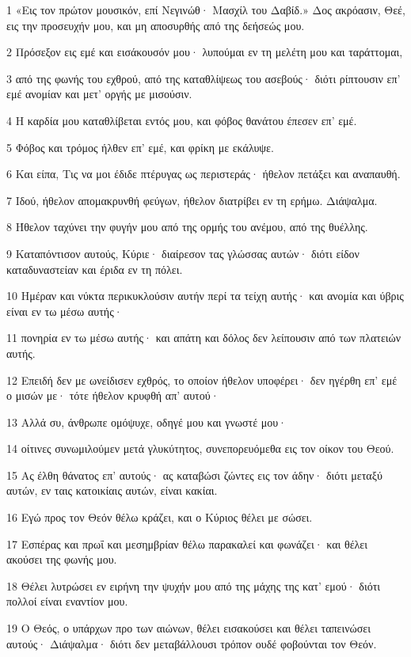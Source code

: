 \par 1 «Εις τον πρώτον μουσικόν, επί Νεγινώθ· Μασχίλ του Δαβίδ.» Δος ακρόασιν, Θεέ, εις την προσευχήν μου, και μη αποσυρθής από της δεήσεώς μου.
\par 2 Πρόσεξον εις εμέ και εισάκουσόν μου· λυπούμαι εν τη μελέτη μου και ταράττομαι,
\par 3 από της φωνής του εχθρού, από της καταθλίψεως του ασεβούς· διότι ρίπτουσιν επ' εμέ ανομίαν και μετ' οργής με μισούσιν.
\par 4 Η καρδία μου καταθλίβεται εντός μου, και φόβος θανάτου έπεσεν επ' εμέ.
\par 5 Φόβος και τρόμος ήλθεν επ' εμέ, και φρίκη με εκάλυψε.
\par 6 Και είπα, Τις να μοι έδιδε πτέρυγας ως περιστεράς· ήθελον πετάξει και αναπαυθή.
\par 7 Ιδού, ήθελον απομακρυνθή φεύγων, ήθελον διατρίβει εν τη ερήμω. Διάψαλμα.
\par 8 Ήθελον ταχύνει την φυγήν μου από της ορμής του ανέμου, από της θυέλλης.
\par 9 Καταπόντισον αυτούς, Κύριε· διαίρεσον τας γλώσσας αυτών· διότι είδον καταδυναστείαν και έριδα εν τη πόλει.
\par 10 Ημέραν και νύκτα περικυκλούσιν αυτήν περί τα τείχη αυτής· και ανομία και ύβρις είναι εν τω μέσω αυτής·
\par 11 πονηρία εν τω μέσω αυτής· και απάτη και δόλος δεν λείπουσιν από των πλατειών αυτής.
\par 12 Επειδή δεν με ωνείδισεν εχθρός, το οποίον ήθελον υποφέρει· δεν ηγέρθη επ' εμέ ο μισών με· τότε ήθελον κρυφθή απ' αυτού·
\par 13 Αλλά συ, άνθρωπε ομόψυχε, οδηγέ μου και γνωστέ μου·
\par 14 οίτινες συνωμιλούμεν μετά γλυκύτητος, συνεπορευόμεθα εις τον οίκον του Θεού.
\par 15 Ας έλθη θάνατος επ' αυτούς· ας καταβώσι ζώντες εις τον άδην· διότι μεταξύ αυτών, εν ταις κατοικίαις αυτών, είναι κακίαι.
\par 16 Εγώ προς τον Θεόν θέλω κράζει, και ο Κύριος θέλει με σώσει.
\par 17 Εσπέρας και πρωΐ και μεσημβρίαν θέλω παρακαλεί και φωνάζει· και θέλει ακούσει της φωνής μου.
\par 18 Θέλει λυτρώσει εν ειρήνη την ψυχήν μου από της μάχης της κατ' εμού· διότι πολλοί είναι εναντίον μου.
\par 19 Ο Θεός, ο υπάρχων προ των αιώνων, θέλει εισακούσει και θέλει ταπεινώσει αυτούς· Διάψαλμα· διότι δεν μεταβάλλουσι τρόπον ουδέ φοβούνται τον Θεόν.
